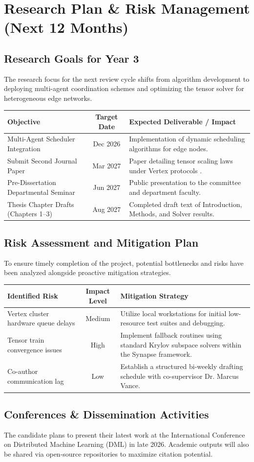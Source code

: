 \section{Research Plan \& Risk Management (Next 12 Months)}

\subsection{Research Goals for Year 3}
The research focus for the next review cycle shifts from algorithm development to deploying multi-agent coordination schemes and optimizing the tensor solver for heterogeneous edge networks.

\medskip
\begin{tabularx}{\textwidth}{>{\hsize=0.3\hsize}X c >{\hsize=0.7\hsize}X}
  \toprule
  \textbf{Objective} & \textbf{Target Date} & \textbf{Expected Deliverable / Impact} \\
  \midrule
  Multi-Agent Scheduler Integration & Dec 2026 & Implementation of dynamic scheduling algorithms for edge nodes. \\
  Submit Second Journal Paper & Mar 2027 & Paper detailing tensor scaling laws under Vertex protocols \cite{vance2026scaling}. \\
  Pre-Dissertation Departmental Seminar & Jun 2027 & Public presentation to the committee and department faculty. \\
  Thesis Chapter Drafts (Chapters 1--3) & Aug 2027 & Completed draft text of Introduction, Methods, and Solver results. \\
  \bottomrule
\end{tabularx}
\medskip

\subsection{Risk Assessment and Mitigation Plan}
To ensure timely completion of the project, potential bottlenecks and risks have been analyzed alongside proactive mitigation strategies.

\medskip
\begin{tabularx}{\textwidth}{>{\hsize=0.3\hsize}X c >{\hsize=0.7\hsize}X}
  \toprule
  \textbf{Identified Risk} & \textbf{Impact Level} & \textbf{Mitigation Strategy} \\
  \midrule
  Vertex cluster hardware queue delays & Medium & Utilize local workstations for initial low-resource test suites and debugging. \\
  Tensor train convergence issues & High & Implement fallback routines using standard Krylov subspace solvers within the Synapse framework. \\
  Co-author communication lag & Low & Establish a structured bi-weekly drafting schedule with co-supervisor Dr. Marcus Vance. \\
  \bottomrule
\end{tabularx}
\medskip

\subsection{Conferences \& Dissemination Activities}
The candidate plans to present their latest work at the International Conference on Distributed Machine Learning (DML) in late 2026. Academic outputs will also be shared via open-source repositories to maximize citation potential.
